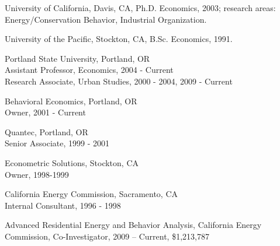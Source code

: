 \documentclass[Computer Science]{vita}
\begin{document}



\begin{vita}

  \begin{Degrees}
  \item University of California, Davis, CA, Ph.D. Economics, 2003;
    research areas: Energy/Conservation Behavior, Industrial
    Organization.

  \item University of the Pacific, Stockton, CA, B.Sc. Economics,
    1991.
  \end{Degrees}

  \begin{Experience}
	
  \item Portland State University,  Portland, OR\\
    Assistant Professor, Economics, 2004 - Current\\
    Research Associate, Urban Studies, 2000 - 2004, 2009 - Current
    
  \item Behavioral Economics, Portland, OR\\
    Owner, 2001 - Current
	
  \item Quantec, Portland, OR\\
    Senior Associate, 1999 - 2001
	
  \item Econometric Solutions, Stockton, CA\\
    Owner, 1998-1999
		
  \item California Energy Commission, Sacramento, CA\\
    Internal Consultant, 1996 - 1998
	
  \end{Experience}


  \begin{Selected Grants and Sponsored Research}

\item Advanced Residential Energy and Behavior Analysis, California Energy Commission, Co-Investigator, 2009 -- Current, \$1,213,787
  

\end{Selected Grants and Sponsored Research}
\end{vita}
\end{document}
